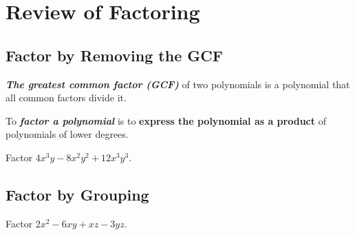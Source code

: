 
\hypertarget{review-of-factoring}{%
\section{Review of Factoring}\label{review-of-factoring}}




\hypertarget{factor-by-removing-the-gcf}{%
\subsection{Factor by Removing the
GCF}\label{factor-by-removing-the-gcf}}

\textbf{\emph{The greatest common factor (GCF)}} of two polynomials is a
polynomial that all common factors divide it.

To \textbf{\emph{factor a polynomial}} is to \textbf{express the
polynomial as a product} of polynomials of lower degrees.

\begin{example}
  Factor \(4x^3y-8x^2y^2+12x^3y^3\).
\end{example}
\vspace*{4\baselineskip}

\hypertarget{factor-by-grouping}{%
\subsection{Factor by Grouping}\label{factor-by-grouping}}

\begin{example}
  Factor \(2x^2-6xy+xz-3yz\).
\end{example}
\vspace*{4\baselineskip}

